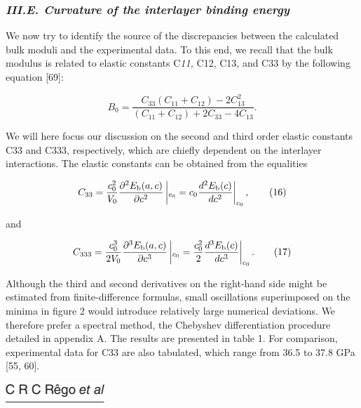 \documentclass{article}
\begin{document}
\subsubsection{\textit{III.E. Curvature of the interlayer binding energy}}

We now try to identify the source of the discrepancies between the calculated bulk moduli and the experimental data. To this end, we recall that the bulk modulus is related to elastic constants C\textit{11,} C12, C13, and C33 by the following equation [69]:

$$B_{0}=\frac{C_{33}(C_{11}+C_{12})-2C_{13}^{2}}{(C_{11}+C_{12})+2C_{33}-4C_{13}}.\tag{15}$$

We will here focus our discussion on the second and third order elastic constants C33 and C333, respectively, which are chiefly dependent on the interlayer interactions. The elastic constants can be obtained from the equalities

$$C_{33}=\frac{c_{0}^{2}}{V_{0}}\frac{\partial^{2}E_{\rm b}(a,c)}{\partial c^{2}}\left|{}_{c_{0}}=c_{0}\frac{d^{2}E_{\rm b}(c)}{dc^{2}}\right|_{c_{0}},\tag{16}$$

and

$$C_{333}=\frac{c_{0}^{3}}{2V_{0}}\frac{\partial^{3}E_{\rm b}(a,c)}{\partial c^{3}}\left|{}_{c_{0}}=\frac{c_{0}^{2}}{2}\frac{d^{3}E_{\rm b}(c)}{dc^{3}}\right|_{c_{0}}.\tag{17}$$

Although the third and second derivatives on the right-hand side might be estimated from finite-difference formulas, small oscillations superimposed on the minima in figure 2 would introduce relatively large numerical deviations. We therefore prefer a spectral method, the Chebyshev differentiation procedure detailed in appendix A. The results are presented in table 1. For comparison, experimental data for C33 are also tabulated, which range from 36.5 to 37.8 GPa [55, 60].


\includegraphics{_page_8_Figure_1.png}
\end{document}
